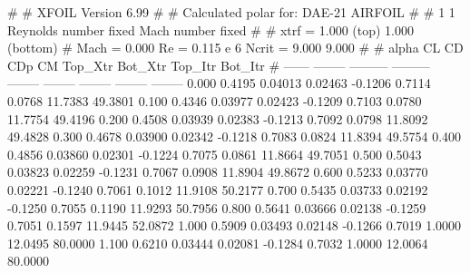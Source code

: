 #  
#       XFOIL         Version 6.99
#  
# Calculated polar for: DAE-21 AIRFOIL                                  
#  
# 1 1 Reynolds number fixed          Mach number fixed         
#  
# xtrf =   1.000 (top)        1.000 (bottom)  
# Mach =   0.000     Re =     0.115 e 6     Ncrit =   9.000  9.000
#  
#   alpha    CL        CD       CDp       CM     Top_Xtr  Bot_Xtr  Top_Itr  Bot_Itr
#  ------ -------- --------- --------- -------- -------- -------- -------- --------
   0.000   0.4195   0.04013   0.02463  -0.1206   0.7114   0.0768  11.7383  49.3801
   0.100   0.4346   0.03977   0.02423  -0.1209   0.7103   0.0780  11.7754  49.4196
   0.200   0.4508   0.03939   0.02383  -0.1213   0.7092   0.0798  11.8092  49.4828
   0.300   0.4678   0.03900   0.02342  -0.1218   0.7083   0.0824  11.8394  49.5754
   0.400   0.4856   0.03860   0.02301  -0.1224   0.7075   0.0861  11.8664  49.7051
   0.500   0.5043   0.03823   0.02259  -0.1231   0.7067   0.0908  11.8904  49.8672
   0.600   0.5233   0.03770   0.02221  -0.1240   0.7061   0.1012  11.9108  50.2177
   0.700   0.5435   0.03733   0.02192  -0.1250   0.7055   0.1190  11.9293  50.7956
   0.800   0.5641   0.03666   0.02138  -0.1259   0.7051   0.1597  11.9445  52.0872
   1.000   0.5909   0.03493   0.02148  -0.1266   0.7019   1.0000  12.0495  80.0000
   1.100   0.6210   0.03444   0.02081  -0.1284   0.7032   1.0000  12.0064  80.0000

